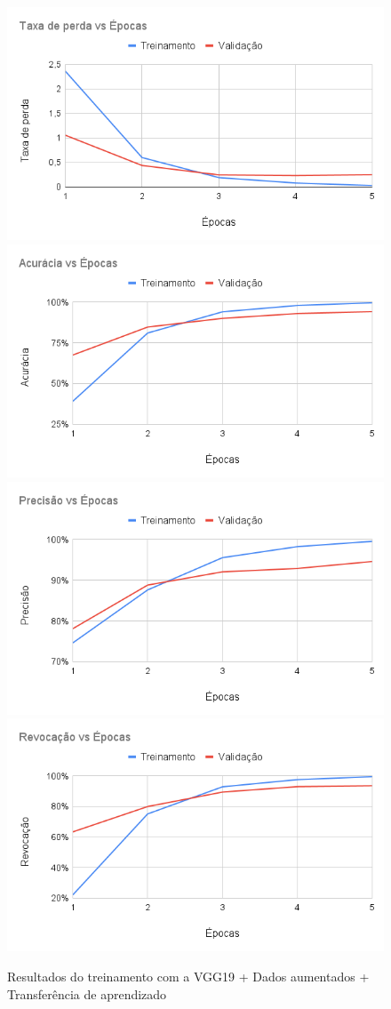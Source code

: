 \documentclass[
	12pt,				%
	oneside,			%
	a4paper,			%
	english,			%
	brazil				%
	]{abntex2ppgsi}
\begin{document}
\begin{figure}[H]
    \centering
    \caption{Resultados do treinamento com a VGG19 + Dados aumentados + Transferência de aprendizado}
    \includegraphics[width=.50\textwidth]{imagens/resultados_discussao/architecture/vgg_19/transfer_learning/augmented/perda.png}\hfill
    \includegraphics[width=.50\textwidth]{imagens/resultados_discussao/architecture/vgg_19/transfer_learning/augmented/acuracia.png}\bigbreak    \includegraphics[width=.50\textwidth]{imagens/resultados_discussao/architecture/vgg_19/transfer_learning/augmented/precisao.png}\hfill
    \includegraphics[width=.50\textwidth]{imagens/resultados_discussao/architecture/vgg_19/transfer_learning/augmented/revocacao.png}
    \label{fig:vgg_19_augmented_transfer_learning}
\end{figure}
\end{document}
